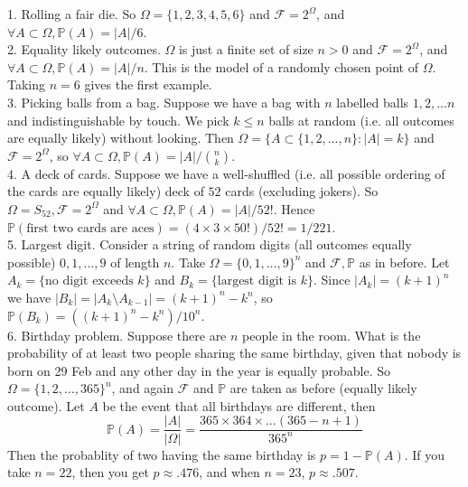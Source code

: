 \begin{example}
    1. Rolling a fair die.
    So $\Omega=\{1,2,3,4,5,6\}$ and $\mathscr F=2^\Omega$, and $\forall A\subset\Omega,\mathbb P(A)=|A|/6$.\\
    2. Equality likely outcomes.
    $\Omega$ is just a finite set of size $n>0$ and $\mathscr F=2^\Omega$, and $\forall A\subset\Omega,\mathbb P(A)=|A|/n$.
    This is the model of a randomly chosen point of $\Omega$.
    Taking $n=6$ gives the first example.\\
    3. Picking balls from a bag.
    Suppose we have a bag with $n$ labelled balls $1,2,\ldots n$ and indistinguishable by touch.
    We pick $k\le n$ balls at random (i.e. all outcomes are equally likely) without looking.
    Then $\Omega=\{A\subset \{1,2,\ldots,n\}:|A|=k\}$ and $\mathscr F=2^\Omega$, so $\forall A\subset\Omega,\mathbb P(A)=|A|/\binom{n}{k}$.\\
    4. A deck of cards.
    Suppose we have a well-shuffled (i.e. all possible ordering of the cards are equally likely) deck of $52$ cards (excluding jokers).
    So $\Omega=S_{52},\mathscr F=2^\Omega$ and $\forall A\subset\Omega,\mathbb P(A)=|A|/52!$.
    Hence $\mathbb P(\text{first two cards are aces})=(4\times 3\times 50!)/52!=1/221$.\\
    5. Largest digit.
    Consider a string of random digits (all outcomes equally possible) $0,1,\ldots,9$ of length $n$.
    Take $\Omega=\{0,1,\ldots,9\}^n$ and $\mathscr F,\mathbb P$ as in before.
    Let $A_k=\{\text{no digit exceeds $k$}\}$ and $B_k=\{\text{largest digit is $k$}\}$.
    Since $|A_k|=(k+1)^n$ we have $|B_k|=|A_k\setminus A_{k-1}|=(k+1)^n-k^n$, so $\mathbb P(B_k)=((k+1)^n-k^n)/10^n$.\\
    6. Birthday problem.
    Suppose there are $n$ people in the room.
    What is the probability of at least two people sharing the same birthday, given that nobody is born on 29 Feb and any other day in the year is equally probable.
    So $\Omega=\{1,2,\ldots,365\}^n$, and again $\mathscr F$ and $\mathbb P$ are taken as before (equally likely outcome).
    Let $A$ be the event that all birthdays are different, then
    $$\mathbb P(A)=\frac{|A|}{|\Omega|}=\frac{365\times 364\times\ldots (365-n+1)}{365^n}$$
    Then the probablity of two having the same birthday is $p=1-\mathbb P(A)$.
    If you take $n=22$, then you get $p\approx .476$, and when $n=23$, $p\approx .507$.
\end{example}
